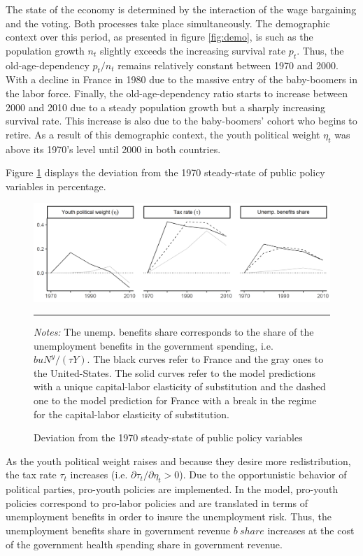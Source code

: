 The state of the economy is determined by the interaction of the wage bargaining and the voting. Both processes take place simultaneously. The demographic context over this period, as presented in figure \ref{fig:demo}, is such as the population growth $n_t$ slightly exceeds the increasing survival rate $p_t$. Thus, the old-age-dependency $p_t/n_t$ remains relatively constant between 1970 and 2000. With a decline in France in 1980 due to the massive entry of the baby-boomers in the labor force. Finally, the old-age-dependency ratio starts to increase between 2000 and 2010 due to a steady population growth but a sharply increasing survival rate. This increase is also due to the baby-boomers' cohort who begins to retire. As a result of this demographic context, the youth political weight $\eta_t$ was above its 1970's level until 2000 in both countries.

Figure \ref{fig:dev_public7010} displays the deviation from the 1970 steady-state of public policy variables in percentage.
\begin{figure}[tb]
	\centering
	\includegraphics[width=1\linewidth]{../result/deviation/dev_public7010.png}
	\caption{Deviation from the 1970 steady-state of public policy variables}
	\label{fig:dev_public7010}
	\vspace{.5ex}
	\hrule
	\vspace{-4ex}
 	\justify\singlespacing\footnotesize \textit{Notes:} The unemp. benefits share corresponds to the share of the unemployment benefits in the government spending, i.e. $buN^y/(\tau Y)$. The black curves refer to France and the gray ones to the United-States. The solid curves refer to the model predictions with a unique capital-labor elasticity of substitution and the dashed one to the model prediction for France with a break in the regime for the capital-labor elasticity of substitution.
\end{figure}
As the youth political weight raises and because they desire more redistribution, the tax rate $\tau_t$ increases (i.e. $\partial \tau_t / \partial \eta_t > 0$). Due to the opportunistic behavior of political parties, pro-youth policies are implemented. In the model, pro-youth policies correspond to pro-labor policies and are translated in terms of unemployment benefits in order to insure the unemployment risk. Thus, the unemployment benefits share in government revenue $b~share$ increases at the cost of the government health spending share in government revenue.

